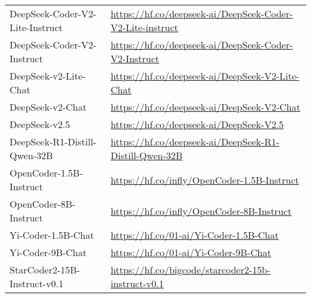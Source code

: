 \documentclass[11pt, a4paper, logo, copyright, nonumbering, amsart]{map}
\begin{document}
\begin{CJK*}{UTF8}{gbsn}
\begin{table*}[h!]
\begin{adjustbox}{width=0.8\textwidth}
\begin{tabular}{l|l}
        DeepSeek-Coder-V2-Lite-Instruct & \url{https://hf.co/deepseek-ai/DeepSeek-Coder-V2-Lite-instruct} \\
        DeepSeek-Coder-V2-Instruct & \url{https://hf.co/deepseek-ai/DeepSeek-Coder-V2-Instruct} \\
        DeepSeek-v2-Lite-Chat & \url{https://hf.co/deepseek-ai/DeepSeek-V2-Lite-Chat} \\
        DeepSeek-v2-Chat & \url{https://hf.co/deepseek-ai/DeepSeek-V2-Chat} \\
        DeepSeek-v2.5 & \url{https://hf.co/deepseek-ai/DeepSeek-V2.5} \\
        DeepSeek-R1-Distill-Qwen-32B & \url{https://hf.co/deepseek-ai/DeepSeek-R1-Distill-Qwen-32B}  \\
        \midrule
        OpenCoder-1.5B-Instruct & \url{https://hf.co/infly/OpenCoder-1.5B-Instruct} \\
        OpenCoder-8B-Instruct & \url{https://hf.co/infly/OpenCoder-8B-Instruct} \\
        Yi-Coder-1.5B-Chat & \url{https://hf.co/01-ai/Yi-Coder-1.5B-Chat} \\
        Yi-Coder-9B-Chat & \url{https://hf.co/01-ai/Yi-Coder-9B-Chat} \\
        StarCoder2-15B-Instruct-v0.1 & \url{https://hf.co/bigcode/starcoder2-15b-instruct-v0.1} \\
        \bottomrule
    \end{tabular}
    \end{adjustbox}
\end{table*}


\end{CJK*}
\end{document}
